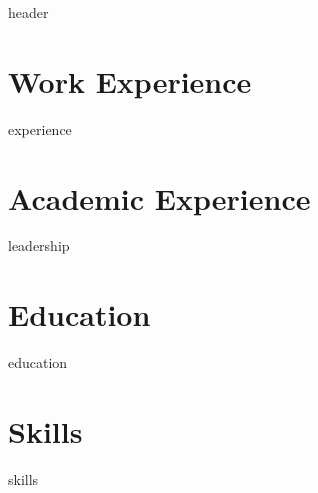 \documentclass[letter,10pt]{article}
\author{Luis Baez}
\begin{document}
{header}
\vspace*{10pt}

\section{Work Experience}
{experience}
\vspace*{10pt}

\section{Academic Experience}
{leadership}
\vspace*{10pt}

\section{Education}
{education}
\vspace*{10pt}


\section{Skills}
\vspace*{3pt}
{skills}
\vspace*{10pt}
\end{document}
